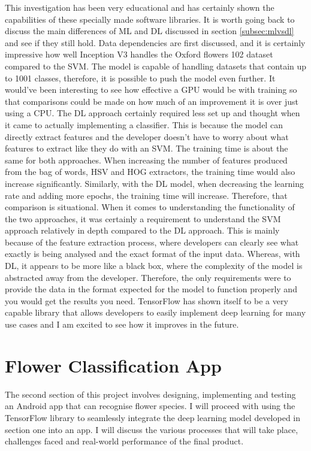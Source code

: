 \documentclass[12pt,a4paper]{report}
\begin{document}
This investigation has been very educational and has certainly shown the capabilities of these specially made software 
libraries. It is worth going back to discuss the main differences of ML and DL discussed in section \ref{subsec:mlvsdl}
and see if they 
still hold. Data dependencies are first discussed, and it is certainly impressive how well Inception V3 handles the 
Oxford flowers 102 dataset compared to the SVM. The model is capable of handling datasets that contain up to 1001 
classes, therefore, it is possible to push the model even further. It would've been interesting to see how effective a 
GPU would be with training so that comparisons could be made on how much of an improvement it is over just using a CPU. 
The DL approach certainly required less set up and thought when it came to actually implementing a classifier. This is 
because the model can directly extract features and the developer doesn't have to worry about what features to extract 
like they do with an SVM. The training time is about the same for both approaches. When increasing the number of 
features produced from the bag of words, HSV and HOG extractors, the training time would also increase significantly. 
Similarly, with the DL model, when decreasing the learning rate and adding more epochs, the training time will increase.
Therefore, that comparison is situational. When it comes to understanding the functionality of the two approaches, it 
was certainly a requirement to understand the SVM approach relatively in depth compared to the DL approach. This is 
mainly because of the feature extraction process, where developers can clearly see what exactly is being analysed and 
the exact format of the input data. Whereas, with DL, it appears to be more like a black box, where the complexity of 
the model is abstracted away from the developer. Therefore, the only requirements were to provide the data in the format
expected for the model to function properly and you would get the results you need. TensorFlow has shown itself to be a 
very capable library that allows developers to easily implement deep learning for many use cases and I am excited to see
how it improves in the future. 


\clearpage

\chapter{Flower Classification App}

The second section of this project involves designing, implementing and testing an Android app that can recognise flower
species. I will proceed with using the TensorFlow library to seamlessly integrate the deep learning model developed in 
section one into an app. I will discuss the various processes that will take place, challenges faced and real-world 
performance of the final product.
\end{document}
